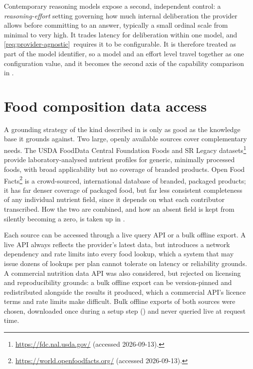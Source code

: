 Contemporary reasoning models expose a second, independent control: a \emph{reasoning-effort} setting governing how much internal deliberation the provider allows before committing to an answer, typically a small ordinal scale from minimal to very high. It trades latency for deliberation within one model, and \ref{req:provider-agnostic}~requires it to be configurable. It is therefore treated as part of the model identifier, so a model and an effort level travel together as one configuration value, and it becomes the second axis of the capability comparison in .

\section{Food composition data access}
\label{sec:tools-food-data}

A grounding strategy of the kind described in  is only as good as the knowledge base it grounds against. Two large, openly available sources cover complementary needs. The USDA FoodData Central Foundation Foods and SR Legacy datasets\footnote{\url{https://fdc.nal.usda.gov/} (accessed 2026-09-13).} provide laboratory-analysed nutrient profiles for generic, minimally processed foods, with broad applicability but no coverage of branded products. Open Food Facts\footnote{\url{https://world.openfoodfacts.org/} (accessed 2026-09-13).} is a crowd-sourced, international database of branded, packaged products; it has far denser coverage of packaged food, but far less consistent completeness of any individual nutrient field, since it depends on what each contributor transcribed. How the two are combined, and how an absent field is kept from silently becoming a zero, is taken up in .

Each source can be accessed through a live query API or a bulk offline export. A live API always reflects the provider's latest data, but introduces a network dependency and rate limits into every food lookup, which a system that may issue dozens of lookups per plan cannot tolerate on latency or reliability grounds. A commercial nutrition data API was also considered, but rejected on licensing and reproducibility grounds: a bulk offline export can be version-pinned and redistributed alongside the results it produced, which a commercial API's licence terms and rate limits make difficult. Bulk offline exports of both sources were chosen, downloaded once during a setup step () and never queried live at request time.

